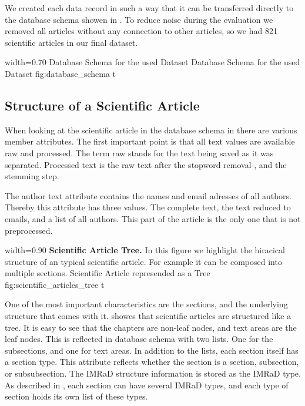 We created each data record in such a way that it can be transferred directly to the database schema showen in . To reduce noise during the evaluation we removed all articles without any connection to other articles, so we had 821 scientific articles in our final dataset.

      {width=0.70\textwidth}
      {Database Schema for the used Dataset}
      {Database Schema for the used Dataset}
      {fig:database_schema}
      {t}

\subsection{Structure of a Scientific Article}
\label{sec:structure_scientific_article}

When looking at the scientific article in the database schema in  there are various member attributes. The first important point is that all text values are available raw and processed. The term raw stands for the text being saved as it was separated. Processed text is the raw text after the stopword removal-, and the stemming step.

The author text attribute contains the names and email adresses of all authors. Thereby this attribute has three values. The complete text, the text reduced to emails, and a list of all authors. This part of the article is the only one that is not preprocessed.

      {width=0.90\textwidth}
      {\textbf{Scientific Article Tree.} In this figure we highlight the hiracical structure of an typical scientific article. For example it can be composed into multiple sections.}
      {Scientific Article represended as a Tree}
      {fig:scientific_articles_tree}
      {t}

One of the most important characteristics are the sections, and the underlying structure that comes with it.  showes that scientific articles are structured like a tree. It is easy to see that the chapters are non-leaf nodes, and text areas are the leaf nodes. This is reflected in database schema with two lists. One for the subsections, and one for text areas. In addition to the lists, each section itself has a section type. This attribute reflects whether the section is a section, subsection, or subsubsection. The IMRaD structure information is stored as the IMRaD type. As described in , each section can have several IMRaD types, and each type of section holds its own list of these types.

